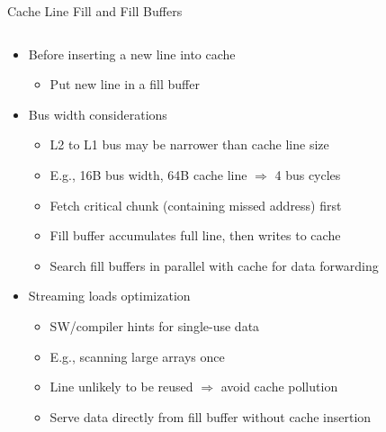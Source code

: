 \documentclass[aspectratio=169,12pt]{beamer}
\begin{document}
\begin{frame}{Cache Line Fill and Fill Buffers}
\begin{columns}[T]
\begin{column}{0.7\textwidth}
\begin{itemize}
  \item Before inserting a new line into cache
  \begin{itemize}
    \item Put new line in a fill buffer
  \end{itemize}
  
  \item Bus width considerations
  \begin{itemize}
    \item L2 to L1 bus may be narrower than cache line size
    \item E.g., 16B bus width, 64B cache line $\Rightarrow$ 4 bus cycles
    \item Fetch critical chunk (containing missed address) first
    \item Fill buffer accumulates full line, then writes to cache
    \item Search fill buffers in parallel with cache for data forwarding
  \end{itemize}
  
  \item Streaming loads optimization
  \begin{itemize}
    \item SW/compiler hints for single-use data
    \item E.g., scanning large arrays once
    \item Line unlikely to be reused $\Rightarrow$ avoid cache pollution
    \item Serve data directly from fill buffer without cache insertion
  \end{itemize}
\end{itemize}
\end{column}

\begin{column}{0.3\textwidth}
\begin{center}
\end{center}
\end{column}
\end{columns}
\end{frame}
\end{document}
